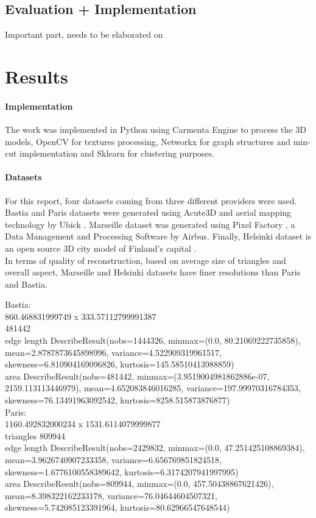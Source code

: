 \documentclass{kththesis}
\begin{document}
\section{Evaluation + Implementation }
Important part, needs to be elaborated on
\chapter{Results}
\subsubsection{Implementation}
The work was implemented in Python using Carmenta Engine to process the 3D models, OpenCV for textures processing, Networkx for graph structures and min-cut implementation and Sklearn for clustering purposes.  
\subsubsection{Datasets}
For this report, four datasets coming from three different providers were used. Bastia and Paris datasets were generated using Acute3D and aerial mapping technology by Ubick \parencite{acute3D}. Marseille dataset was generated using Pixel Factory \parencite{pixel_factory}, a Data Management and Processing Software by Airbus. Finally, Helsinki dataset is an open source 3D city model of Finland's capital \parencite{helsinki}. \\
In terms of quality of reconstruction, based on average size of triangles and overall aspect, Marseille and Helsinki datasets have finer resolutions than Paris and Bastia. 


Bastia:  \\ 
860.468831999749  x  333.57112799991387 \\
481442 \\
edge length DescribeResult(nobs=1444326, minmax=(0.0, 80.21069222735858), mean=2.8787873645898996, variance=4.522909319961517, skewness=6.810904169096826, kurtosis=145.58510413988859) \\ 
area DescribeResult(nobs=481442, minmax=(3.9519004981862886e-07, 2159.113113446979), mean=4.652083846016285, variance=197.99970316784353, skewness=76.13491963092542, kurtosis=8258.515873876877) \\ 

Paris: \\
1160.492832000234  x  1531.6114079999877 \\
triangles 809944 \\
edge length DescribeResult(nobs=2429832, minmax=(0.0, 47.251425108869384), mean=3.9626740907233358, variance=6.656769851824518, skewness=1.6776100558389642, kurtosis=6.3174207941997995) \\
area DescribeResult(nobs=809944, minmax=(0.0, 457.50438867621426), mean=8.398322162233178, variance=76.04644604507321, skewness=5.742085123391964, kurtosis=80.62966547648544) \\
\end{document}
